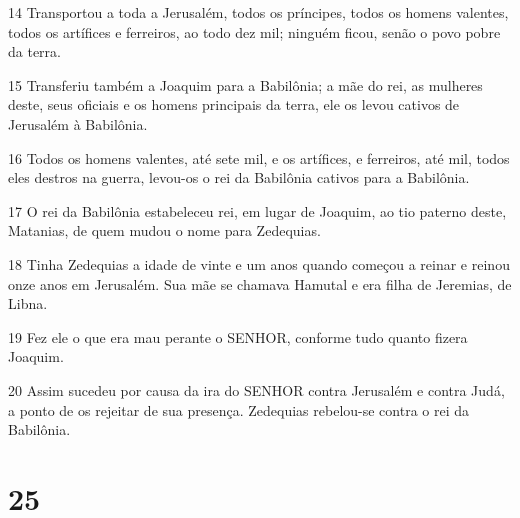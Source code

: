 \par 14 Transportou a toda a Jerusalém, todos os príncipes, todos os homens valentes, todos os artífices e ferreiros, ao todo dez mil; ninguém ficou, senão o povo pobre da terra.
\par 15 Transferiu também a Joaquim para a Babilônia; a mãe do rei, as mulheres deste, seus oficiais e os homens principais da terra, ele os levou cativos de Jerusalém à Babilônia.
\par 16 Todos os homens valentes, até sete mil, e os artífices, e ferreiros, até mil, todos eles destros na guerra, levou-os o rei da Babilônia cativos para a Babilônia.
\par 17 O rei da Babilônia estabeleceu rei, em lugar de Joaquim, ao tio paterno deste, Matanias, de quem mudou o nome para Zedequias.
\par 18 Tinha Zedequias a idade de vinte e um anos quando começou a reinar e reinou onze anos em Jerusalém. Sua mãe se chamava Hamutal e era filha de Jeremias, de Libna.
\par 19 Fez ele o que era mau perante o SENHOR, conforme tudo quanto fizera Joaquim.
\par 20 Assim sucedeu por causa da ira do SENHOR contra Jerusalém e contra Judá, a ponto de os rejeitar de sua presença. Zedequias rebelou-se contra o rei da Babilônia.

\chapter{25}

